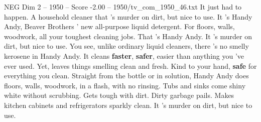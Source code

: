 \begin{textsample}{NEG Dim 2 – 1950 – Score -2.00 – 1950/tv\_com\_1950\_46.txt}  \label{ex:f2_neg_090}
It just had to happen.
A household cleaner that 's murder on dirt, but nice to use.
It 's Handy Andy, Beaver Brothers ' new all-purpose liquid detergent.
For floors, walls, woodwork, all your toughest cleaning jobs.
That 's Handy Andy.
It 's murder on dirt, but nice to use.
You see, unlike ordinary liquid cleaners, there 's no smelly kerosene in Handy Andy.
It cleans \textbf{faster}, \textbf{safer}, easier than anything you 've ever used.
Yet, leaves things smelling clean and fresh.
Kind to your hand, \textbf{safe} for everything you clean.
Straight from the bottle or in solution, Handy Andy does floors, walls, woodwork, in a flash, with no rinsing.
Tubs and sinks come shiny white without scrubbing.
Gets tough with dirt.
Dirty garbage pails.
Makes kitchen cabinets and refrigerators sparkly clean.
It 's murder on dirt, but nice to use.

\end{textsample}
